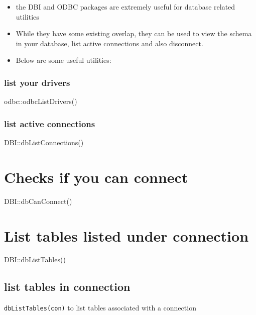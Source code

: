 \documentclass[
  letterpaper,
  DIV=11,
  numbers=noendperiod]{scrreprt}
\providecommand{\tightlist}{%
  \setlength{\itemsep}{0pt}\setlength{\parskip}{0pt}}\usepackage{longtable,booktabs,array}
\begin{document}
\begin{tcolorbox}[enhanced jigsaw, opacitybacktitle=0.6, bottomtitle=1mm, arc=.35mm, bottomrule=.15mm, title=\textcolor{quarto-callout-note-color}{\faInfo}\hspace{0.5em}{Additional Utilities}, colframe=quarto-callout-note-color-frame, toptitle=1mm, coltitle=black, rightrule=.15mm, breakable, left=2mm, titlerule=0mm, toprule=.15mm, leftrule=.75mm, opacityback=0, colbacktitle=quarto-callout-note-color!10!white, colback=white]

\begin{itemize}
\tightlist
\item
  the DBI and ODBC packages are extremely useful for database related
  utilities
\item
  While they have some existing overlap, they can be used to view the
  schema in your database, list active connections and also disconnect.
\item
  Below are some useful utilities:
\end{itemize}

\subsubsection{list your drivers}\label{list-your-drivers}

odbc::odbcListDrivers()

\subsubsection{list active connections}\label{list-active-connections}

DBI::dbListConnections()

\section{Checks if you can connect}\label{checks-if-you-can-connect}

DBI::dbCanConnect()

\section{List tables listed under
connection}\label{list-tables-listed-under-connection}

DBI::dbListTables()

\subsection{list tables in connection}\label{list-tables-in-connection}

\texttt{dbListTables(con)} to list tables associated with a connection

\end{tcolorbox}
\end{document}
